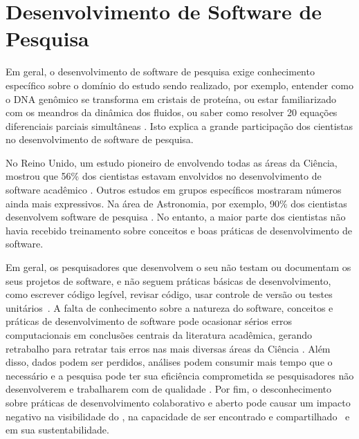 
\section{Desenvolvimento de Software de Pesquisa}
\label{sec:desenvolvimento}

Em geral, o desenvolvimento de software de pesquisa exige conhecimento
específico sobre o domínio do estudo sendo realizado,
por exemplo, entender como o DNA genômico
se transforma em cristais de proteína, ou estar familiarizado com os meandros
da dinâmica dos fluidos, ou saber como resolver 20 equações diferenciais
parciais simultâneas \cite{segal2008developing}.
%
Isto explica a grande participação dos cientistas no desenvolvimento de
software de pesquisa. 

No Reino Unido, um estudo pioneiro de \cite{hettrick2014uk} envolvendo todas as áreas da Ciência, mostrou que 56\% dos cientistas estavam envolvidos no desenvolvimento de software acadêmico \cite{hettrick2014uk}.
Outros estudos em grupos específicos mostraram números ainda mais expressivos. Na área de Astronomia, por exemplo, 90\% dos cientistas desenvolvem software de pesquisa \cite{momcheva2015software}.
%
No entanto, a maior parte dos cientistas não havia recebido treinamento sobre conceitos e boas práticas de desenvolvimento de software. 

Em geral, os pesquisadores que desenvolvem o seu \RSw
não testam ou documentam os seus projetos de software, e não seguem práticas básicas de desenvolvimento, como escrever código
legível, revisar código, usar controle de versão 
ou testes unitários~\cite{wilson2017good}.
%
A falta de conhecimento sobre a natureza do software, conceitos e práticas de desenvolvimento de software pode ocasionar sérios erros computacionais em conclusões centrais da literatura acadêmica, gerando retrabalho para retratar tais erros nas mais diversas áreas da Ciência \cite{merali2010computational}.
Além disso, dados podem ser perdidos, análises podem consumir mais tempo que o necessário e a pesquisa pode ter sua eficiência comprometida se pesquisadores não desenvolverem e trabalharem com \RSw de qualidade \cite{wilson2017good}.
Por fim, o desconhecimento sobre práticas de desenvolvimento colaborativo e aberto pode causar um impacto negativo na visibilidade do \RS, na capacidade de ser encontrado e  compartilhado~\cite{howison2013incentives,
katz2014transitive} e em sua sustentabilidade.


